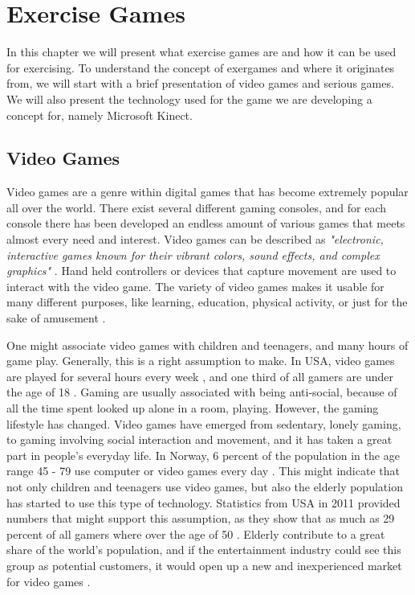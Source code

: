 \chapter{Exercise Games}
In this chapter we will present what exercise games are and how it can be used for exercising. To understand the concept of exergames and where it originates from, we will start with a brief presentation of video games and serious games. We will also present the technology used for the game we are developing a concept for, namely Microsoft Kinect. 

\section{Video Games}

Video games are a genre within digital games that has become extremely popular all over the world. There exist several different gaming consoles, and for each console there has been developed an endless amount of various games that meets almost every need and interest. Video games can be described as \emph{"electronic, interactive games known for their vibrant colors, sound effects, and complex graphics"} \cite{videogamedef}. Hand held controllers or devices that capture movement are used to interact with the video game. The variety of video games makes it usable for many different purposes, like learning, education, physical activity, or just for the sake of amusement \cite{project}. 

One might associate video games with children and teenagers, and many hours of game play. Generally, this is a right assumption to make. In USA, video games are played for several hours every week \cite{foxnews}, and one third of all gamers are under the age of 18 \cite{videogames2012}. Gaming are usually associated with being anti-social, because of all the time spent looked up alone in a room, playing. However, the gaming lifestyle has changed. Video games have emerged from sedentary, lonely gaming, to gaming involving social interaction and movement, and it has taken a great part in people's everyday life. In Norway, 6 percent of the population in the age range 45 - 79 use computer or video games every day \cite{mediebarometer2012}. This might indicate that not only children and teenagers use video games, but also the elderly population has started to use this type of technology. Statistics from USA in 2011 provided numbers that might support this assumption, as they show that as much as 29 percent of all gamers where over the age of 50 \cite{videogames2011}. Elderly contribute to a great share of the world's population, and if the entertainment industry could see this group as potential customers, it would open up a new and inexperienced market for video games \cite{ijsselsteijn2007digital}. 

